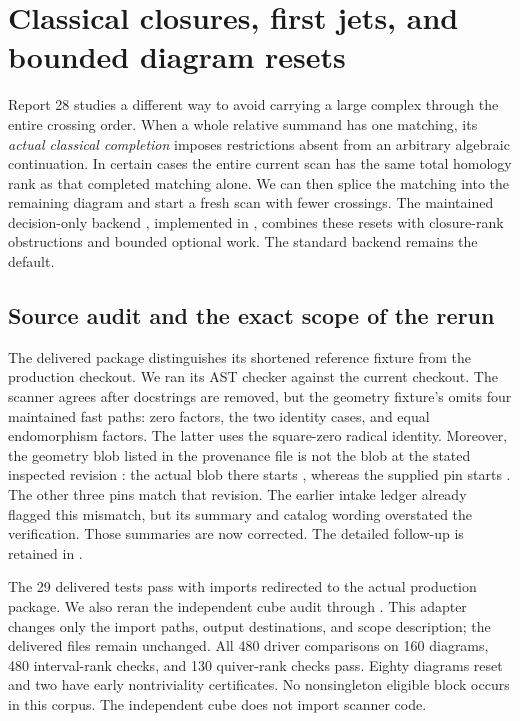 \section{Classical closures, first jets, and bounded diagram resets}
\label{sec:closure-resets}

Report 28 studies a different way to avoid carrying a large complex through
the entire crossing order.  When a whole relative summand has one matching,
its \emph{actual classical completion} imposes restrictions absent from an
arbitrary algebraic continuation.  In certain cases the entire current
scan has the same total homology rank as that completed matching alone.
We can then splice the matching into the remaining diagram and start a
fresh scan with fewer crossings.  The maintained decision-only backend
, implemented in , combines
these resets with closure-rank obstructions and bounded optional work.
The standard backend remains the default.

\subsection{Source audit and the exact scope of the rerun}

The delivered package distinguishes its shortened reference fixture from
the production checkout.  We ran its AST checker against the current
checkout.  The scanner agrees after docstrings are removed, but the
geometry fixture's  omits four maintained fast paths:
zero factors, the two identity cases, and equal endomorphism factors.
The latter uses the square-zero radical identity.  Moreover, the geometry
blob listed in the provenance file is not the blob at the stated inspected
revision : the actual blob there starts ,
whereas the supplied pin starts .  The other three pins
match that revision.  The earlier intake ledger already flagged this
mismatch, but its summary and catalog wording overstated the verification.
Those summaries are now corrected.  The detailed follow-up is retained in
.

The 29 delivered tests pass with imports redirected to the actual
production package.  We also reran the independent cube audit through
.  This adapter changes only
the import paths, output destinations, and scope description; the delivered
files remain unchanged.  All 480 driver comparisons on 160 diagrams,
480 interval-rank checks, and 130 quiver-rank checks pass.  Eighty diagrams
reset and two have early nontriviality certificates.  No nonsingleton
eligible block occurs in this corpus.  The independent cube does not
import scanner code.

